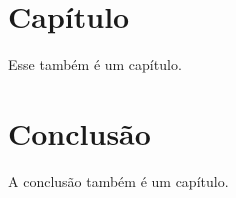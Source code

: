 \documentclass[tcc/eca]{faeng}
\begin{document}
\listatabelas


\sumario

\mainmatter


\chapter[Capítulo]{Capítulo}
Esse também é um capítulo.

\chapter[Conclusão]{Conclusão}
A conclusão também é um capítulo.

\postextual
\end{document}
